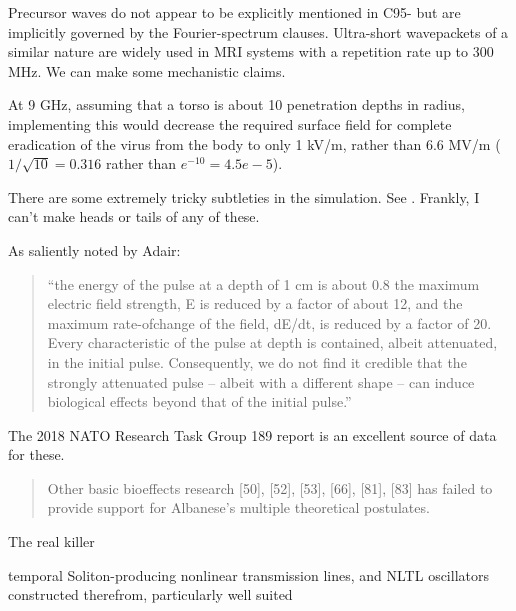 \documentclass[paper.tex]{subfiles}
\begin{document}
Precursor waves do not appear to be explicitly mentioned in C95- but are implicitly governed by the Fourier-spectrum clauses. Ultra-short wavepackets of a similar nature are widely used in MRI systems with a repetition rate up to 300 MHz. We can make some mechanistic claims.

At 9 GHz, assuming that a torso is about 10 penetration depths in radius, implementing this would decrease the required surface field for complete eradication of the virus from the body to only 1 kV/m, rather than 6.6 MV/m ($1/\sqrt{10}=0.316$ rather than $e^{-10}=4.5e-5$). 





There are some extremely tricky subtleties in the simulation. See \cite{Comments1993}. Frankly, I can't make heads or tails of any of these. 

As saliently noted by Adair:

\begin{quote}
	“the energy of the pulse at a depth of 1 cm is about 0.8%
	the maximum electric field strength, E is reduced by a factor of about 12, and the maximum rate-ofchange of the field, dE/dt, is reduced by a factor of 20. Every characteristic of the pulse at depth is
	contained, albeit attenuated, in the initial pulse. Consequently, we do not find it credible that the
	strongly attenuated pulse – albeit with a different shape – can induce biological effects beyond that of
	the initial pulse.”
\end{quote}


The 2018 NATO Research Task Group 189 report \cite{treatyelectromagnetic} is an excellent source of data for these. 

\begin{quote}
	Other basic bioeffects research [50], [52], [53], [66], [81], [83] has failed to provide support for Albanese’s multiple	theoretical postulates.
\end{quote}

The real killer 





temporal Soliton-producing nonlinear transmission lines, and NLTL oscillators constructed therefrom, particularly well suited 




\footnotemark

\end{document}
